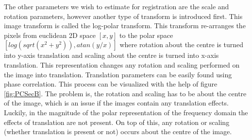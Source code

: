 The other parameters we wish to estimate for registration are the scale and rotation parameters, however another type of transform is introduced first. This image transform is called the log-polar transform. This transform re-arranges the pixels from euclidean 2D space $[x,y]$ to the polar space $[log(sqrt(x^2+y^2)),atan(y/x)]$ where rotation about the centre is turned into y-axis translation and scaling about the centre is turned into x-axis translation. This representation changes any rotation and scaling performed on the image into translation. Translation parameters can be easily found using phase correlation. This process can be visualized with the help of figure \ref{fig:PCSecB}. The problem is, the rotation and scaling has to be about the centre of the image, which is an issue if the images contain any translation effects. Luckily, in the magnitude of the polar representation of the frequency domain the effects of translation are not present. On top of this, any rotation or scaling (whether translation is present or not) occurs about the centre of the image. \\

